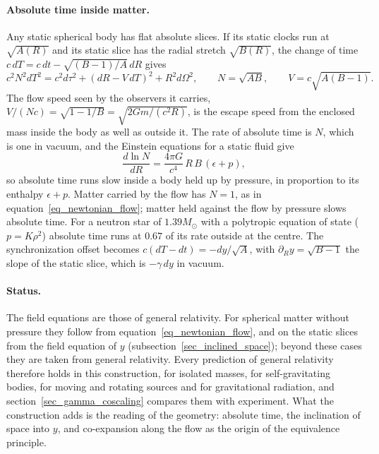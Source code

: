 \documentclass{iopjournal}
\begin{document}
\paragraph{Absolute time inside matter.} Any static spherical body has flat absolute slices. If its static clocks run at $\sqrt{A(R)}$ and its static slice has the radial stretch $\sqrt{B(R)}$, the change of time $c\,dT=c\,dt-\sqrt{(B-1)/A}\,dR$ gives
\begin{equation}\label{eq_absolute_time_matter}
    c^2N^2dT^2=c^2d\tau^2+\left(dR-V\,dT\right)^2+R^2d\Omega^2,
    \qquad
    N=\sqrt{AB},
    \qquad
    V=c\sqrt{A(B-1)} .
\end{equation}
The flow speed seen by the observers it carries, $V/(Nc)=\sqrt{1-1/B}=\sqrt{2Gm/(c^2R)}$, is the escape speed from the enclosed mass inside the body as well as outside it. The rate of absolute time is $N$, which is one in vacuum, and the Einstein equations for a static fluid give
\begin{equation}\label{eq_enthalpy_rate}
    \frac{d\ln N}{dR}=\frac{4\pi G}{c^4}\,R\,B\,(\epsilon+p) ,
\end{equation}
so absolute time runs slow inside a body held up by pressure, in proportion to its enthalpy $\epsilon+p$. Matter carried by the flow has $N=1$, as in equation~\eqref{eq_newtonian_flow}; matter held against the flow by pressure slows absolute time. For a neutron star of $1.39M_\odot$ with a polytropic equation of state ($p=K\rho^2$) absolute time runs at $0.67$ of its rate outside at the centre. The synchronization offset becomes $c(dT-dt)=-dy/\sqrt{A}$, with $\partial_Ry=\sqrt{B-1}$ the slope of the static slice, which is $-\gamma\,dy$ in vacuum.

\paragraph{Status.} The field equations are those of general relativity. For spherical matter without pressure they follow from equation~\eqref{eq_newtonian_flow}, and on the static slices from the field equation of $y$ (subsection~\ref{sec_inclined_space}); beyond these cases they are taken from general relativity. Every prediction of general relativity therefore holds in this construction, for isolated masses, for self-gravitating bodies, for moving and rotating sources and for gravitational radiation, and section~\ref{sec_gamma_coscaling} compares them with experiment. What the construction adds is the reading of the geometry: absolute time, the inclination of space into $y$, and co-expansion along the flow as the origin of the equivalence principle.
\end{document}
